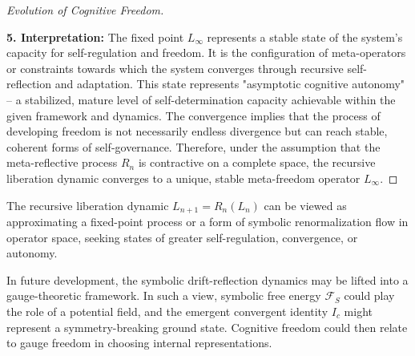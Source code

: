 \begin{proof}[Evolution of Cognitive Freedom]
\begin{itemize}
\end{itemize}
\textbf{5. Interpretation:}
The fixed point $L_\infty$ represents a stable state of the system's capacity for self-regulation and freedom. It is the configuration of meta-operators or constraints towards which the system converges through recursive self-reflection and adaptation. This state represents "asymptotic cognitive autonomy" – a stabilized, mature level of self-determination capacity achievable within the given framework and dynamics. The convergence implies that the process of developing freedom is not necessarily endless divergence but can reach stable, coherent forms of self-governance.
Therefore, under the assumption that the meta-reflective process $R_n$ is contractive on a complete space, the recursive liberation dynamic converges to a unique, stable meta-freedom operator $L_\infty$.
\end{proof}
\begin{remark}
\label{remark:bk9_recursive_seeking}
The recursive liberation dynamic $L_{n+1} = R_n(L_n)$ can be viewed as approximating a fixed-point process or a form of symbolic renormalization flow in operator space, seeking states of greater self-regulation, convergence, or autonomy.
\end{remark}
\begin{remark}
\label{remark:bk9_gauge_theoretic_perspective}
In future development, the symbolic drift-reflection dynamics may be lifted into a gauge-theoretic framework. In such a view, symbolic free energy $\mathcal{F}_S$ could play the role of a potential field, and the emergent convergent identity $I_c$ might represent a symmetry-breaking ground state. Cognitive freedom could then relate to gauge freedom in choosing internal representations.
\end{remark}
